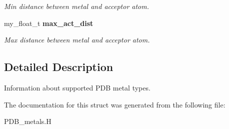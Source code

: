 \begin{CompactItemize}
\begin{CompactList}\small\item\em Min distance between metal and acceptor atom. \item\end{CompactList}\item 
my\_\-float\_\-t \bf{max\_\-act\_\-dist}\label{structASCbase_1_1pdb__metal__info__t_5ddea155e9606c373fdaaa47235b6adf}

\begin{CompactList}\small\item\em Max distance between metal and acceptor atom. \item\end{CompactList}\end{CompactItemize}


\subsection{Detailed Description}
Information about supported PDB metal types. 



The documentation for this struct was generated from the following file:\begin{CompactItemize}
\item 
PDB\_\-metals.H\end{CompactItemize}
